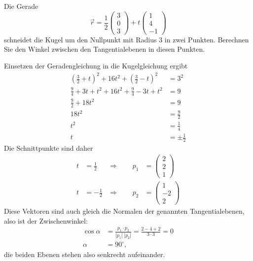 Die Gerade
\[
\vec r
=
\frac12\begin{pmatrix}3\\0\\3\end{pmatrix}
+t
\begin{pmatrix}1\\4\\-1\end{pmatrix}
\]
schneidet die Kugel um den Nullpunkt mit Radius $3$ in zwei Punkten.
Berechnen Sie den Winkel zwischen den Tangentialebenen in diesen
Punkten.


\begin{loesung}
Einsetzen der Geradengleichung in die Kugelgleichung ergibt
\begin{align*}
(\frac32+t)^2 + 16t^2 + (\frac32 - t)^2&=3^2\\
\frac94+3t+t^2+16t^2+\frac94-3t+t^2&=9\\
\frac92+18t^2&=9\\
18t^2&=\frac92\\
t^2&=\frac14\\
t&=\pm\frac12
\end{align*}
Die Schnittpunkte sind daher
\begin{align*}
t&=\frac12&\Rightarrow\qquad p_1&=\begin{pmatrix}2\\2\\1\end{pmatrix}\\
t&=-\frac12&\Rightarrow\qquad p_2&=\begin{pmatrix}1\\-2\\2\end{pmatrix}
\end{align*}
Diese Vektoren sind auch gleich die Normalen der genannten Tangentialebenen,
also ist der Zwischenwinkel:
\begin{align*}
\cos\alpha&=\frac{p_1\cdot p_2}{|p_1|\;|p_2|} =\frac{2-4+2}{3\cdot 3}=0
\\
\alpha&=90^\circ,
\end{align*}
die beiden Ebenen stehen also senkrecht aufeinander.
\end{loesung}


